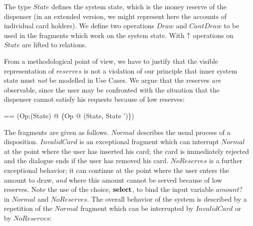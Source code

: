 The type ${State}$ defines the system state, which is the money
reserve of the dispenser (in an extended version, we might represent
here the accounts of individual card holders).  We define two
operations $Draw$ and $CantDraw$ to be used in the fragments which
work on the system state. With $\uparrow$ operations on ${State}$ are
lifted to relations.

From a methodological point of view, we have to justify that the
visible representation of $reserves$ is not a violation of our
principle that inner system state must \emph{not} be modelled in Use
Cases. We argue that the reserves \emph{are} observable, since the
user may be confronted with the situation that the dispenser cannot
satisfy his requests because of low reserves:

\begin{zedgroup}
\begin{axdef}
  \mkrel == (\lambda Op:\power(\Delta State) @ 
                         \{Op @ (\theta State, \theta State ')\})
\end{axdef}
\end{zedgroup}

The fragments are given as follows. $Normal$ describes the usual
process of a disposition.  $InvalidCard$ is an exceptional fragment
which can interrupt $Normal$ at the point where the user has inserted
his card; the card is immediately rejected and the dialogue ends if
the user has removed his card.  $NoReserves$ is a further exceptional
behavior; it can continue at the point where the user enters the
amount to draw, \emph{and} where this amount cannot be served because
of low reserves. Note the use of the choice, $\mathop{{\mathbf{select}}}$, to bind the
input variable $amount?$ in $Normal$ and $NoReserves$.  The overall
behavior of the system is described by a repetition of the $Normal$
fragment which can be interrupted by $InvalidCard$ or by $NoReserves$:


